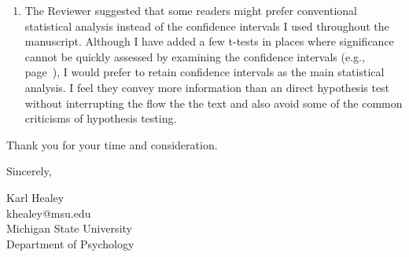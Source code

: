 \documentclass[12pt]{article}
\begin{document}
\begin{enumerate}
	\item
	The Reviewer suggested that some readers might prefer conventional statistical analysis instead of the confidence intervals I used throughout the manuscript. Although I have added a few t-tests in places where significance cannot be quickly assessed by examining the confidence intervals (e.g., page~\pageref{t1}), I would prefer to retain confidence intervals as the main statistical analysis. I feel they convey more information than an direct hypothesis test without interrupting the flow the the text and also avoid some of the common criticisms of hypothesis testing.





	

\end{enumerate}





\vspace{20pt}

Thank you for your time and consideration.

\vspace{10pt}

Sincerely,

\vspace{10pt}

Karl Healey\\
khealey@msu.edu\\
Michigan State University\\
Department of Psychology


\end{document}
